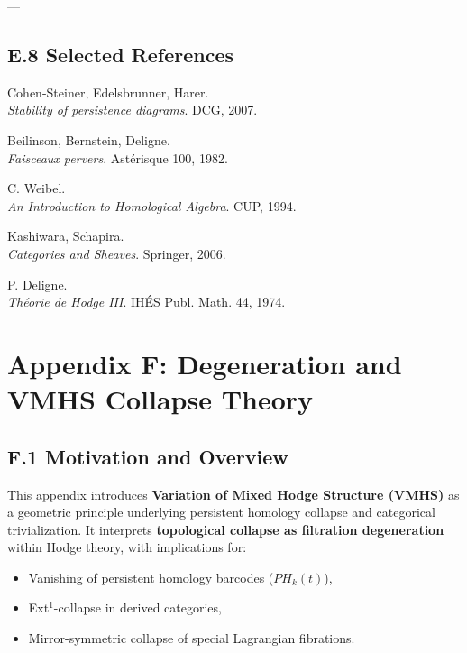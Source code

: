\documentclass[11pt]{article}
\begin{document}
---

\subsection*{E.8 Selected References}

\begin{thebibliography}{9}

Cohen-Steiner, Edelsbrunner, Harer.\\
\textit{Stability of persistence diagrams}. DCG, 2007.

Beilinson, Bernstein, Deligne.\\
\textit{Faisceaux pervers}. Astérisque 100, 1982.

C. Weibel.\\
\textit{An Introduction to Homological Algebra}. CUP, 1994.

Kashiwara, Schapira.\\
\textit{Categories and Sheaves}. Springer, 2006.

P. Deligne.\\
\textit{Théorie de Hodge III}. IHÉS Publ. Math. 44, 1974.

\end{thebibliography}



\section*{Appendix F: Degeneration and VMHS Collapse Theory}

\subsection*{F.1 Motivation and Overview}

This appendix introduces \textbf{Variation of Mixed Hodge Structure (VMHS)} as a geometric principle  
underlying persistent homology collapse and categorical trivialization.  
It interprets \textbf{topological collapse as filtration degeneration} within Hodge theory, with implications for:

\begin{itemize}
  \item Vanishing of persistent homology barcodes ($PH_k(t)$),
  \item Ext$^1$-collapse in derived categories,
  \item Mirror-symmetric collapse of special Lagrangian fibrations.
\end{itemize}
\end{document}
